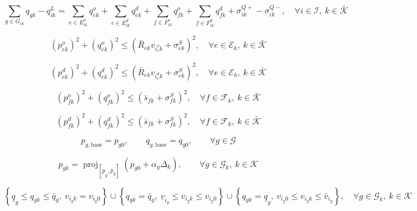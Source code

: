 \documentclass{article}
\begin{document}
\begin{equation}
\sum_{g \in G_{ik}} q_{gk} - q_{ik}^L =
\sum_{e \in E_{ik}^o} q_{ek}^o
+ \sum_{e \in E_{ik}^d} q_{ek}^d
+ \sum_{f \in F_{ik}^o} q_{fk}^o
+ \sum_{f \in F_{ik}^d} q_{fk}^d
+ \sigma_{ik}^{Q+} - \sigma_{ik}^{Q-},
\quad \forall i \in \mathcal{I},\ k \in \bar{\mathcal{K}}
\tag{2.1h}
\end{equation}

\begin{equation}
(p_{ek}^o)^2 + (q_{ek}^o)^2
\le \left(\bar{R}_{ek} v_{i_e^o k} + \sigma_{ek}^S\right)^2,
\quad \forall e \in \mathcal{E}_k,\ k \in \bar{\mathcal{K}}
\tag{2.1i}
\end{equation}

\begin{equation}
(p_{ek}^d)^2 + (q_{ek}^d)^2
\le \left(\bar{R}_{ek} v_{i_e^d k} + \sigma_{ek}^S\right)^2,
\quad \forall e \in \mathcal{E}_k,\ k \in \bar{\mathcal{K}}
\tag{2.1j}
\end{equation}

\begin{equation}
(p_{fk}^o)^2 + (q_{fk}^o)^2
\le \left(\bar{s}_{fk} + \sigma_{fk}^S\right)^2,
\quad \forall f \in \mathcal{F}_k,\ k \in \bar{\mathcal{K}}
\tag{2.1k}
\end{equation}

\begin{equation}
(p_{fk}^d)^2 + (q_{fk}^d)^2
\le \left(\bar{s}_{fk} + \sigma_{fk}^S\right)^2,
\quad \forall f \in \mathcal{F}_k,\ k \in \bar{\mathcal{K}}
\tag{2.1l}
\end{equation}

\begin{equation}
p_{g,\text{base}} = p_{g0}, \qquad q_{g,\text{base}} = q_{g0},
\qquad \forall g \in \mathcal{G}
\tag{2.1m}
\end{equation}

\begin{equation}
p_{gk} = \operatorname{proj}_{[\underline{p}_g,\bar{p}_g]}
\left(p_{g0} + \alpha_g \Delta_k\right),
\qquad \forall g \in \mathcal{G}_k,\ k \in \mathcal{K}
\tag{2.1n}
\end{equation}

\begin{equation}
\left\{
\underline{q}_g \le q_{gk} \le \bar{q}_g,\ v_{i_g k} = v_{i_g 0}
\right\}
\cup
\left\{
q_{gk} = \bar{q}_g,\ \underline{v}_{i_g} \le v_{i_g k} \le v_{i_g 0}
\right\}
\cup
\left\{
q_{gk} = \underline{q}_g,\ v_{i_g 0} \le v_{i_g k} \le \bar{v}_{i_g}
\right\},
\quad \forall g \in \mathcal{G}_k,\ k \in \mathcal{K}
\tag{2.1o}
\end{equation}
\end{document}
